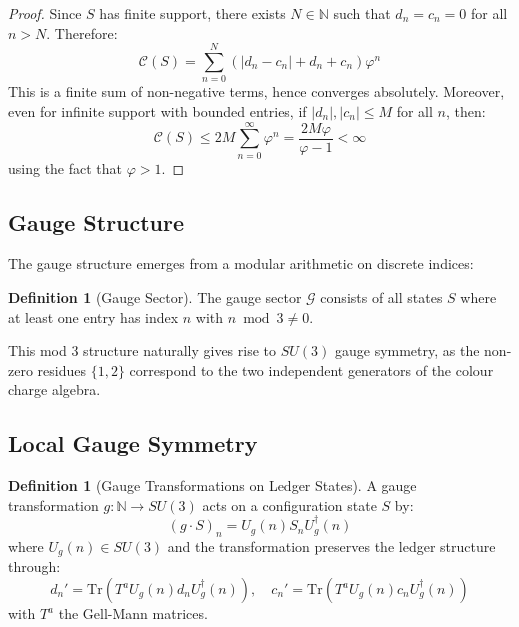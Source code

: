 \documentclass[11pt]{article}
\numberwithin{equation}{section}
\theoremstyle{definition}
\newtheorem{definition}[theorem]{Definition}
\theoremstyle{remark}
\begin{document}
\begin{proof}
Since $S$ has finite support, there exists $N \in \mathbb{N}$ such that $d_n = c_n = 0$ for all $n > N$. Therefore:
\begin{equation}
\mathcal{C}(S) = \sum_{n=0}^{N} \left(|d_n - c_n| + d_n + c_n\right) \varphi^n
\end{equation}
This is a finite sum of non-negative terms, hence converges absolutely. Moreover, even for infinite support with bounded entries, if $|d_n|, |c_n| \leq M$ for all $n$, then:
\begin{equation}
\mathcal{C}(S) \leq 2M \sum_{n=0}^{\infty} \varphi^n = \frac{2M\varphi}{\varphi - 1} < \infty
\end{equation}
using the fact that $\varphi > 1$.
\end{proof}

\subsection{Gauge Structure}

The gauge structure emerges from a modular arithmetic on discrete indices:

\begin{definition}[Gauge Sector]
The gauge sector $\mathcal{G}$ consists of all states $S$ where at least one entry has index $n$ with $n \bmod 3 \neq 0$.
\end{definition}

This mod 3 structure naturally gives rise to $SU(3)$ gauge symmetry, as the non-zero residues $\{1, 2\}$ correspond to the two independent generators of the colour charge algebra.

\subsection{Local Gauge Symmetry}

\begin{definition}[Gauge Transformations on Ledger States]
A gauge transformation $g: \mathbb{N} \to SU(3)$ acts on a configuration state $S$ by:
\begin{equation}
(g \cdot S)_n = U_g(n) S_n U_g^\dagger(n)
\end{equation}
where $U_g(n) \in SU(3)$ and the transformation preserves the ledger structure through:
\begin{equation}
d_n' = \text{Tr}(T^a U_g(n) d_n U_g^\dagger(n)), \quad c_n' = \text{Tr}(T^a U_g(n) c_n U_g^\dagger(n))
\end{equation}
with $T^a$ the Gell-Mann matrices.
\end{definition}
\end{document}
